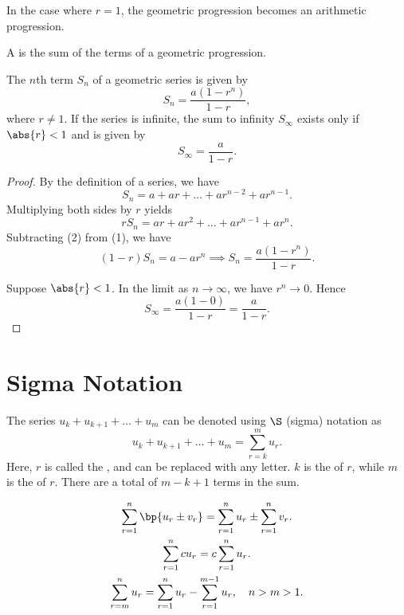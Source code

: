 \begin{remark}
    In the case where $r = 1$, the geometric progression becomes an arithmetic progression.
\end{remark}

\begin{definition}
    A  is the sum of the terms of a geometric progression.
\end{definition}

\begin{proposition}
    The $n$th term $S_n$ of a geometric series is given by \[S_n = \frac{a(1 - r^n)}{1 - r},\] where $r \neq 1$. If the series is infinite, the sum to infinity $S_\infty$ exists only if $\abs{r} < 1$ and is given by \[S_\infty = \frac{a}{1 - r}.\]
\end{proposition}
\begin{proof}
    By the definition of a series, we have \[S_n = a + ar + \dots + ar^{n-2} + ar^{n-1}. \tag{1}\] Multiplying both sides by $r$ yields \[r S_n = ar + ar^2 + \dots + ar^{n-1} + ar^{n}. \tag{2}\] Subtracting (2) from (1), we have \[(1-r)S_n = a - ar^{n} \implies S_n = \frac{a(1 - r^{n})}{1 - r}.\]
    
    Suppose $\abs{r} < 1$. In the limit as $n \to \infty$, we have $r^n \to 0$. Hence \[S_\infty = \frac{a(1 - 0)}{1 - r} = \frac{a}{1-r}.\]
\end{proof}

\section{Sigma Notation}

\begin{definition}
    The series $u_k + u_{k+1} + \dots + u_m$ can be denoted using $\S$ (sigma) notation as \[u_k + u_{k+1} + \dots + u_m = \sum_{r=k}^m u_r.\] Here, $r$ is called the , and can be replaced with any letter. $k$ is the  of $r$, while $m$ is the  of $r$. There are a total of $m - k + 1$ terms in the sum.
\end{definition}

\begin{fact}
    \begin{gather*}
        \sum_{r = 1}^n \bp{u_r \pm v_r} = \sum_{r = 1}^n u_r \pm \sum_{r = 1}^n v_r.\\
        \sum_{r = 1}^n cu_r = c\sum_{r = 1}^n u_r.\\
        \sum_{r = m}^n u_r = \sum_{r = 1}^n u_r - \sum_{r = 1}^{m-1} u_r, \quad n > m > 1.
    \end{gather*}
\end{fact}

